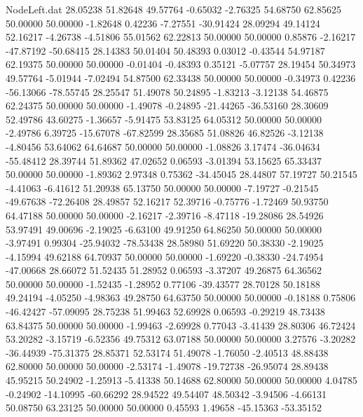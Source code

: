 \begin{filecontents}{NodeLeft.dat}
  28.05238   51.82648   49.57764    -0.65032   -2.76325   54.68750   62.85625   50.00000   50.00000   -1.82648    0.42236   -7.27551  -30.91424
  28.09294   49.14124   52.16217    -4.26738   -4.51806   55.01562   62.22813   50.00000   50.00000    0.85876   -2.16217  -47.87192  -50.68415
  28.14383   50.01404   50.48393     0.03012   -0.43544   54.97187   62.19375   50.00000   50.00000   -0.01404   -0.48393    0.35121   -5.07757
  28.19454   50.34973   49.57764    -5.01944   -7.02494   54.87500   62.33438   50.00000   50.00000   -0.34973    0.42236  -56.13066  -78.55745
  28.25547   51.49078   50.24895    -1.83213   -3.12138   54.46875   62.24375   50.00000   50.00000   -1.49078   -0.24895  -21.44265  -36.53160
  28.30609   52.49786   43.60275    -1.36657   -5.91475   53.83125   64.05312   50.00000   50.00000   -2.49786    6.39725  -15.67078  -67.82599
  28.35685   51.08826   46.82526    -3.12138   -4.80456   53.64062   64.64687   50.00000   50.00000   -1.08826    3.17474  -36.04634  -55.48412
  28.39744   51.89362   47.02652     0.06593   -3.01394   53.15625   65.33437   50.00000   50.00000   -1.89362    2.97348    0.75362  -34.45045
  28.44807   57.19727   50.21545    -4.41063   -6.41612   51.20938   65.13750   50.00000   50.00000   -7.19727   -0.21545  -49.67638  -72.26408
  28.49857   52.16217   52.39716    -0.75776   -1.72469   50.93750   64.47188   50.00000   50.00000   -2.16217   -2.39716   -8.47118  -19.28086
  28.54926   53.97491   49.00696    -2.19025   -6.63100   49.91250   64.86250   50.00000   50.00000   -3.97491    0.99304  -25.94032  -78.53438
  28.58980   51.69220   50.38330    -2.19025   -4.15994   49.62188   64.70937   50.00000   50.00000   -1.69220   -0.38330  -24.74954  -47.00668
  28.66072   51.52435   51.28952     0.06593   -3.37207   49.26875   64.36562   50.00000   50.00000   -1.52435   -1.28952    0.77106  -39.43577
  28.70128   50.18188   49.24194    -4.05250   -4.98363   49.28750   64.63750   50.00000   50.00000   -0.18188    0.75806  -46.42427  -57.09095
  28.75238   51.99463   52.69928     0.06593   -0.29219   48.73438   63.84375   50.00000   50.00000   -1.99463   -2.69928    0.77043   -3.41439
  28.80306   46.72424   53.20282    -3.15719   -6.52356   49.75312   63.07188   50.00000   50.00000    3.27576   -3.20282  -36.44939  -75.31375
  28.85371   52.53174   51.49078    -1.76050   -2.40513   48.88438   62.80000   50.00000   50.00000   -2.53174   -1.49078  -19.72738  -26.95074
  28.89438   45.95215   50.24902    -1.25913   -5.41338   50.14688   62.80000   50.00000   50.00000    4.04785   -0.24902  -14.10995  -60.66292
  28.94522   49.54407   48.50342    -3.94506   -4.66131   50.08750   63.23125   50.00000   50.00000    0.45593    1.49658  -45.15363  -53.35152

\end{filecontents}
